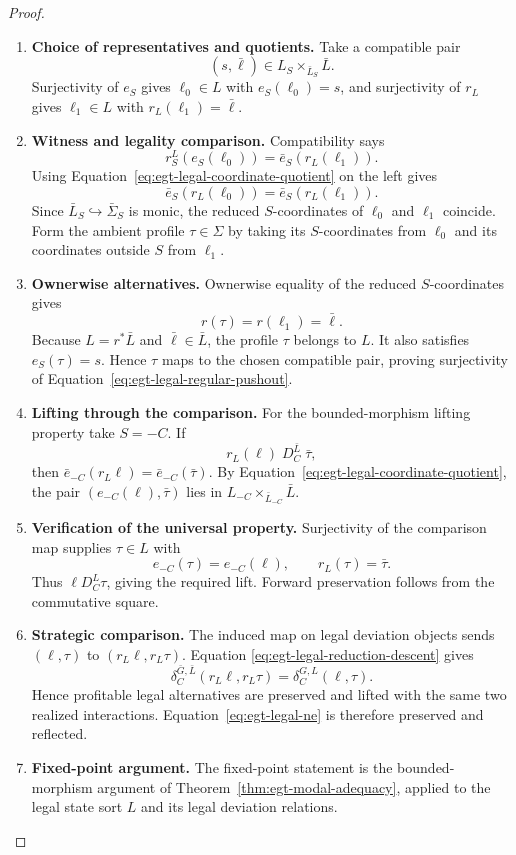 \documentclass[11pt,a4paper]{article}
\numberwithin{equation}{section}
\theoremstyle{definition}
\theoremstyle{remark}
\theoremstyle{plain}
\begin{document}
\begin{proof}
\leavevmode
\begin{enumerate}[label=\textup{(\arabic*)},leftmargin=*,itemsep=4pt,topsep=3pt]
  \item \textbf{Choice of representatives and quotients.} Take a compatible pair
\[
 (s,\bar\ell)\in L_S\times_{\bar L_S}\bar L.
\]
Surjectivity of $e_S$ gives $\ell_0\in L$ with $e_S(\ell_0)=s$, and
surjectivity of $r_L$ gives $\ell_1\in L$ with
$r_L(\ell_1)=\bar\ell$.
  \item \textbf{Witness and legality comparison.} Compatibility says
\[
 r_S^L(e_S(\ell_0))
 =\bar e_S(r_L(\ell_1)).
\]
Using Equation~\eqref{eq:egt-legal-coordinate-quotient} on the left gives
\[
 \bar e_S(r_L(\ell_0))=\bar e_S(r_L(\ell_1)).
\]
Since $\bar L_S\hookrightarrow\bar\Sigma_S$ is monic, the reduced
$S$-coordinates of $\ell_0$ and $\ell_1$ coincide. Form the ambient profile
$\tau\in\Sigma$ by taking its $S$-coordinates from $\ell_0$ and its
coordinates outside $S$ from $\ell_1$.
  \item \textbf{Ownerwise alternatives.} Ownerwise equality of the reduced
$S$-coordinates gives
\[
 r(\tau)=r(\ell_1)=\bar\ell.
\]
Because $L=r^*\bar L$ and $\bar\ell\in\bar L$, the profile $\tau$ belongs to
$L$. It also satisfies $e_S(\tau)=s$. Hence $\tau$ maps to the chosen
compatible pair, proving surjectivity of
Equation~\eqref{eq:egt-legal-regular-pushout}.
  \item \textbf{Lifting through the comparison.} For the bounded-morphism lifting property take $S=-C$. If
\[
 r_L(\ell)\;D_C^{\bar L}\;\bar\tau,
\]
then
$\bar e_{-C}(r_L\ell)=\bar e_{-C}(\bar\tau)$. By
Equation~\eqref{eq:egt-legal-coordinate-quotient}, the pair
$(e_{-C}(\ell),\bar\tau)$ lies in
$L_{-C}\times_{\bar L_{-C}}\bar L$.
  \item \textbf{Verification of the universal property.} Surjectivity of the comparison map
supplies $\tau\in L$ with
\[
 e_{-C}(\tau)=e_{-C}(\ell),
 \qquad
 r_L(\tau)=\bar\tau.
\]
Thus $\ell D_C^L\tau$, giving the required lift. Forward preservation follows
from the commutative square.
  \item \textbf{Strategic comparison.} The induced map on legal deviation objects sends
$(\ell,\tau)$ to $(r_L\ell,r_L\tau)$. Equation
\eqref{eq:egt-legal-reduction-descent} gives
\[
 \delta_C^{\bar G,\bar L}(r_L\ell,r_L\tau)
 =\delta_C^{G,L}(\ell,\tau).
\]
Hence profitable legal alternatives are preserved and lifted with the same
two realized interactions. Equation~\eqref{eq:egt-legal-ne} is therefore
preserved and reflected.
  \item \textbf{Fixed-point argument.} The fixed-point statement is the bounded-morphism
argument of Theorem~\ref{thm:egt-modal-adequacy}, applied to the legal state
sort $L$ and its legal deviation relations.
\end{enumerate}
\end{proof}
\end{document}
